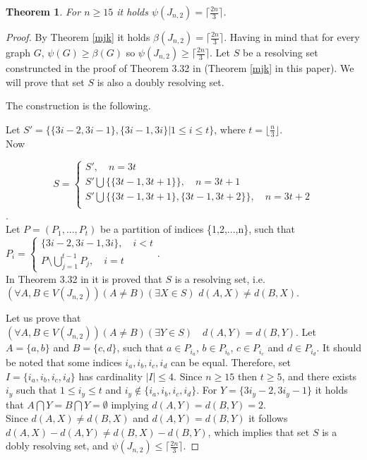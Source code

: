 \documentclass[preprint,12pt]{elsarticle}
\newtheorem{thm}{Theorem}
\begin{document}
\begin{thm} \label{j2} For $n \ge 15$ it holds  $\psi(J_{n,2}) = \lceil \frac{2n}{3} \rceil$.
\end{thm}
\begin{proof} By Theorem \ref{mjk} it holds $\beta(J_{n,2}) = \lceil \frac{2n}{3} \rceil$.
Having in mind that for every graph $G$, $\psi(G) \ge \beta(G)$ so $\psi(J_{n,2}) \ge \lceil \frac{2n}{3} \rceil$.
Let $S$ be a resolving set construncted in the proof of Theorem 3.32 in \cite{metdj1} (Theorem \ref{mjk} in this paper). 
We will prove that set $S$ is also a doubly resolving set.

The construction is the following.

Let $S'= \{ \{3i-2,3i-1\},\{3i-1,3i\} | 1 \le i \le t\}$, where $t = \lfloor \frac{n}{3} \rfloor$.\\

Now 

\begin{equation} \label{dbas}
S= \begin{cases} S' , \quad n=3t \\ 
S' \bigcup \{  \{3t-1,3t+1\} \},  \quad n=3t+1 \\
S' \bigcup \{  \{3t-1,3t+1\},   \{3t-1,3t+2\} \}, \quad n=3t+2 \\
\end{cases}
\end{equation} . \\

Let $P=(P_1,...,P_t)$ be a partition of indices \{1,2,...,n\}, 
such that \\ $P_i = \begin{cases} \{3i-2,3i-1,3i\}, \quad  i<t \\ P \setminus \bigcup\limits_{j = 1}^{t - 1} {{P_j}} ,  \quad i=t   \end{cases}$.\\

In Theorem 3.32 in \cite{metdj1} it is proved that $S$ is a resolving set, i.e. $(\forall A,B \in V(J_{n,2})) (A \ne B) (\exists X \in S)$
 $d(A,X) \ne d(B,X)$.

Let us prove that $(\forall A,B \in V(J_{n,2})) (A \ne B) (\exists Y \in S) \quad d(A,Y) = d(B,Y)$.
Let $A = \{a,b\}$ and $B=\{c,d\}$, such that $a \in P_{i_a}$, $b \in P_{i_b}$, $c \in P_{i_c}$ and
$d \in P_{i_d}$. It should be noted that some indices $i_a,i_b,i_c,i_d$ can be equal.
Therefore, set $I = \{i_a,i_b,i_c,i_d\}$ has cardinality $|I| \le 4$.
Since $n \ge 15$ then $t \ge 5$, and there exists $i_y$ such that $1 \le i_y \le t$ and $i_y \notin \{i_a,i_b,i_c,i_d\}$.
For $Y = \{3 i_y -2, 3 i_y-1\}$ it holds that $A \bigcap Y = B \bigcap Y = \emptyset$ implying $d(A,Y)=d(B,Y)=2$. \\

Since  $d(A,X) \ne d(B,X)$ and $d(A,Y)=d(B,Y)$ it follows $d(A,X) - d(A,Y) \ne d(B,X) - d(B,Y)$,
which implies that set $S$ is a dobly resolving set, and $\psi(J_{n,2}) \le \lceil \frac{2n}{3} \rceil$.
\end{proof} 
\end{document}
